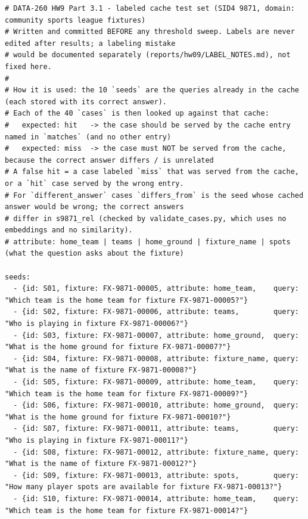 \documentclass[11pt]{article}
\begin{document}
\begingroup\lstset{basicstyle=\ttfamily\tiny}
\begin{lstlisting}
# DATA-260 HW9 Part 3.1 - labeled cache test set (SID4 9871, domain: community sports league fixtures)
# Written and committed BEFORE any threshold sweep. Labels are never edited after results; a labeling mistake
# would be documented separately (reports/hw09/LABEL_NOTES.md), not fixed here.
#
# How it is used: the 10 `seeds` are the queries already in the cache (each stored with its correct answer).
# Each of the 40 `cases` is then looked up against that cache:
#   expected: hit   -> the case should be served by the cache entry named in `matches` (and no other entry)
#   expected: miss  -> the case must NOT be served from the cache, because the correct answer differs / is unrelated
# A false hit = a case labeled `miss` that was served from the cache, or a `hit` case served by the wrong entry.
# For `different_answer` cases `differs_from` is the seed whose cached answer would be wrong; the correct answers
# differ in s9871_rel (checked by validate_cases.py, which uses no embeddings and no similarity).
# attribute: home_team | teams | home_ground | fixture_name | spots (what the question asks about the fixture)

seeds:
  - {id: S01, fixture: FX-9871-00005, attribute: home_team,    query: "Which team is the home team for fixture FX-9871-00005?"}
  - {id: S02, fixture: FX-9871-00006, attribute: teams,        query: "Who is playing in fixture FX-9871-00006?"}
  - {id: S03, fixture: FX-9871-00007, attribute: home_ground,  query: "What is the home ground for fixture FX-9871-00007?"}
  - {id: S04, fixture: FX-9871-00008, attribute: fixture_name, query: "What is the name of fixture FX-9871-00008?"}
  - {id: S05, fixture: FX-9871-00009, attribute: home_team,    query: "Which team is the home team for fixture FX-9871-00009?"}
  - {id: S06, fixture: FX-9871-00010, attribute: home_ground,  query: "What is the home ground for fixture FX-9871-00010?"}
  - {id: S07, fixture: FX-9871-00011, attribute: teams,        query: "Who is playing in fixture FX-9871-00011?"}
  - {id: S08, fixture: FX-9871-00012, attribute: fixture_name, query: "What is the name of fixture FX-9871-00012?"}
  - {id: S09, fixture: FX-9871-00013, attribute: spots,        query: "How many player spots are available for fixture FX-9871-00013?"}
  - {id: S10, fixture: FX-9871-00014, attribute: home_team,    query: "Which team is the home team for fixture FX-9871-00014?"}


\end{lstlisting}
\end{document}
